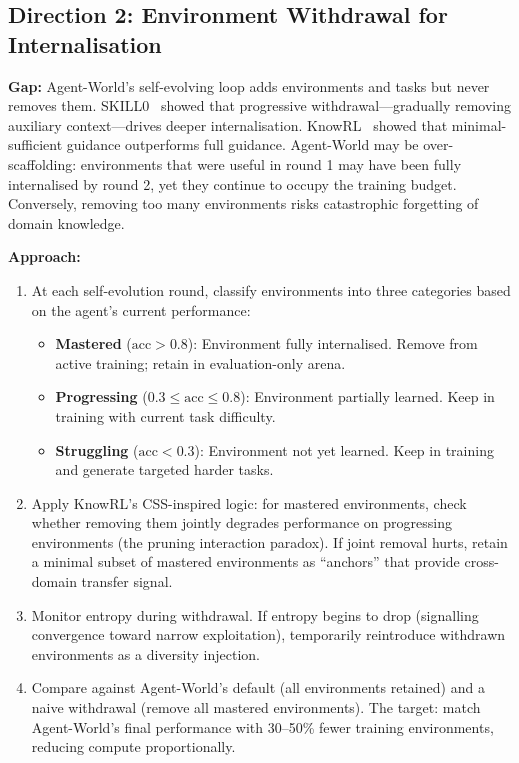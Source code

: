 \documentclass[11pt]{article}
\begin{document}
\subsection{Direction 2: Environment Withdrawal for Internalisation}

\textbf{Gap:} Agent-World's self-evolving loop adds environments and tasks but never removes them. SKILL0~\cite{skill0} showed that progressive withdrawal---gradually removing auxiliary context---drives deeper internalisation. KnowRL~\cite{knowrl} showed that minimal-sufficient guidance outperforms full guidance. Agent-World may be over-scaffolding: environments that were useful in round 1 may have been fully internalised by round 2, yet they continue to occupy the training budget. Conversely, removing too many environments risks catastrophic forgetting of domain knowledge.

\textbf{Approach:}
\begin{enumerate}
    \item At each self-evolution round, classify environments into three categories based on the agent's current performance:
    \begin{itemize}
        \item \textbf{Mastered} ($\mathrm{acc} > 0.8$): Environment fully internalised. Remove from active training; retain in evaluation-only arena.
        \item \textbf{Progressing} ($0.3 \leq \mathrm{acc} \leq 0.8$): Environment partially learned. Keep in training with current task difficulty.
        \item \textbf{Struggling} ($\mathrm{acc} < 0.3$): Environment not yet learned. Keep in training and generate targeted harder tasks.
    \end{itemize}

    \item Apply KnowRL's CSS-inspired logic: for mastered environments, check whether removing them jointly degrades performance on progressing environments (the pruning interaction paradox). If joint removal hurts, retain a minimal subset of mastered environments as ``anchors'' that provide cross-domain transfer signal.

    \item Monitor entropy during withdrawal. If entropy begins to drop (signalling convergence toward narrow exploitation), temporarily reintroduce withdrawn environments as a diversity injection.

    \item Compare against Agent-World's default (all environments retained) and a naive withdrawal (remove all mastered environments). The target: match Agent-World's final performance with 30--50\% fewer training environments, reducing compute proportionally.
\end{enumerate}
\end{document}
